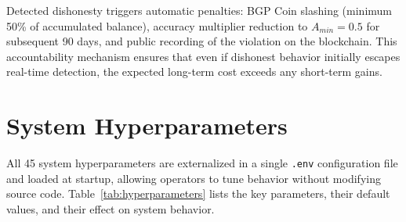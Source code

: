 Detected dishonesty triggers automatic penalties: BGP Coin slashing (minimum 50\% of accumulated balance), accuracy multiplier reduction to $A_{min} = 0.5$ for subsequent 90 days, and public recording of the violation on the blockchain. This accountability mechanism ensures that even if dishonest behavior initially escapes real-time detection, the expected long-term cost exceeds any short-term gains.




\section{System Hyperparameters}
\label{app:hyperparameters}

All 45 system hyperparameters are externalized in a single \texttt{.env} configuration file and loaded at startup, allowing operators to tune behavior without modifying source code. Table~\ref{tab:hyperparameters} lists the key parameters, their default values, and their effect on system behavior.

\begin{table}[t]
\centering
\caption{Key System Hyperparameters}
\label{tab:hyperparameters}
\end{table}

